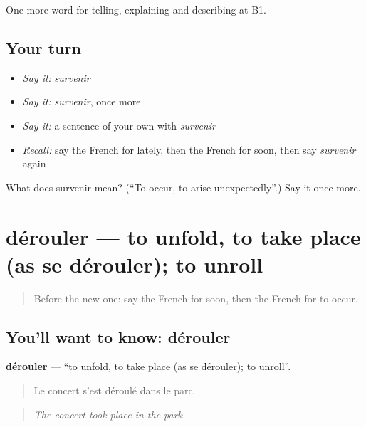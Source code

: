 \begin{grammarlens}[title={What you've built}]
One more word for telling, explaining and describing at B1.
\end{grammarlens}

\subsection*{Your turn}
\begin{itemize}
\raggedright
  \item \emph{Say it:} \emph{survenir}
  \item \emph{Say it:} \emph{survenir}, once more
  \item \emph{Say it:} a sentence of your own with \emph{survenir}
  \item \emph{Recall:} say the French for lately, then the French for soon, then say \emph{survenir} again
\end{itemize}

\begin{tcolorbox}[breakable,colback=teal!4,colframe=teal!35!black,title={Before you move on}]
What does survenir mean? (\textquotedblleft{}To occur, to arise unexpectedly\textquotedblright{}.) Say it once more.
\end{tcolorbox}
\section[dérouler]{dérouler — to unfold, to take place (as se dérouler); to unroll}

\label{lesson:FR-C274-derouler}



\begin{quote}
Before the new one: say the French for soon, then the French for to occur.
\end{quote}

\subsection*{You'll want to know: dérouler}
\textbf{dérouler} — \textquotedblleft{}to unfold, to take place (as se dérouler); to unroll\textquotedblright{}.

\begin{quote}
Le concert s'est déroulé dans le parc.
\end{quote}

\begin{quote}
\emph{The concert took place in the park.}
\end{quote}

